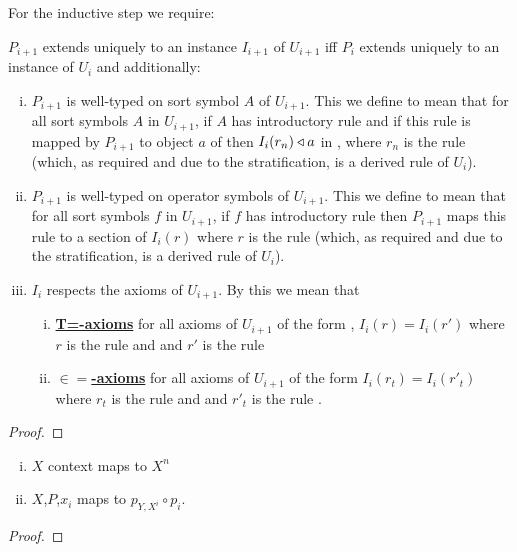 For the inductive step we require:
\begin{lemmastar}
\item $P_{i+1}$ extends uniquely to an instance $I_{i+1}$ of $U_{i+1}$ iff  $P_i$ extends uniquely to an instance of $U_{i}$ and additionally:
\begin{enumerate}[(i)]
\item
$P_{i+1}$ is well-typed on sort symbol $A$ of $U_{i+1}$. This we define to mean that
for all sort symbols $A$ in $U_{i+1}$, if $A$ has introductory rule 
\genericAintroductoryrule and if this rule is mapped by $P_{i+1}$
to object $a$ of \catcw then $I_i(r_n) \triangleleft a$ in \catc, where $r_n$ is the rule 
 (which, as required and due to the stratification, is a derived rule of $U_i$).
\item  $P_{i+1}$ is well-typed on operator symbols  of $U_{i+1}$. This we define to mean that
for all sort symbols $f$ in $U_{i+1}$, if $f$ has introductory rule 
\genericfintroductoryrule then $P_{i+1}$ maps this rule to a section 
of $I_i(r)$ where $r$ is the rule
 (which, as required and due to the stratification, is a derived rule of $U_i$). 
\item
 $I_i$ respects the axioms of $U_{i+1}$. By this we mean that 
\begin{enumerate}[(i)]
\item \underline{\textbf{T=-axioms}} 
for all axioms of $U_{i+1}$ of the form
 ,
$I_i(r) = I_i(r')$ where $r$ is the rule
 and  
and $r'$ is the rule 
\item \underline{\textbf{$\boldsymbol{\in=}$-axioms}} 
for all axioms of $U_{i+1}$ of the form
$I_i(r_t) = I_i(r'_t)$ where $r_t$ is the rule
 and  
and $r'_t$ is the rule .
\end{enumerate}
\end{enumerate}
\end{lemmastar}
\begin{proof} 
\tbd
\end{proof}

\begin{lemma}
\label{Xnlemma}
\begin{enumerate}[(i)]
\item
$X$ context maps to $X^n$
\item 
$X$,$P$,$x_i$ maps to $p_{Y,X^i}\circ p_i$.
\end{enumerate}
\end{lemma}
\begin{proof}
\end{proof}